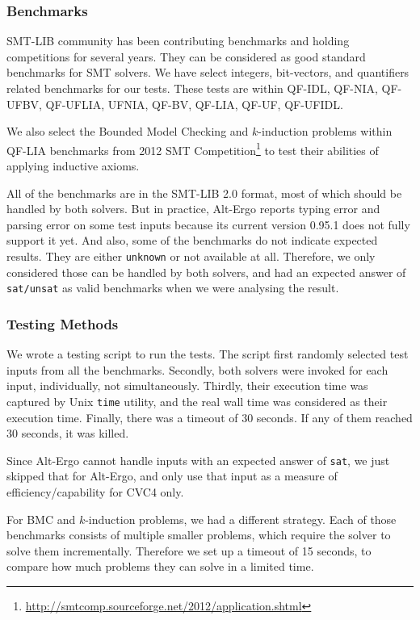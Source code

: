 \documentclass[10pt,letter]{article}
\theoremstyle{definition}
\begin{document}
\subsubsection{Benchmarks}

SMT-LIB community has been contributing benchmarks and holding competitions for several years\cite{bs2010}. They can be considered as good standard benchmarks for SMT solvers. We have select integers, bit-vectors, and quantifiers related benchmarks for our tests. These tests are within QF-IDL, QF-NIA, QF-UFBV, QF-UFLIA, UFNIA, QF-BV, QF-LIA, QF-UF, QF-UFIDL.

We also select the Bounded Model Checking and $k$-induction problems within QF-LIA benchmarks from 2012 SMT Competition\footnote{\url{http://smtcomp.sourceforge.net/2012/application.shtml}}\cite{cok20122012}
to test their abilities of applying inductive axioms.

All of the benchmarks are in the SMT-LIB 2.0 format, most of which should be handled by both solvers. But in practice, Alt-Ergo reports typing error and parsing error on some test inputs because its current version 0.95.1 does not fully support it yet. And also, some of the benchmarks do not indicate expected results. They are either {\tt unknown} or not available at all. Therefore, we only considered those can be handled by both solvers, and had an expected answer of {\tt sat/unsat} as valid benchmarks when we were analysing the result.

\subsubsection{Testing Methods}

We wrote a testing script to run the tests. The script first randomly selected test inputs from all the benchmarks. Secondly, both solvers were invoked for each input, individually, not simultaneously. Thirdly, their execution time was captured by Unix {\tt time} utility, and the real wall time was considered as their execution time. Finally, there was a timeout of 30 seconds. If any of them reached 30 seconds, it was killed. 

Since Alt-Ergo cannot handle inputs with an expected answer of {\tt sat}, we just skipped that for Alt-Ergo, and only use that input as a measure of efficiency/capability for CVC4 only.

For BMC and $k$-induction problems, we had a different strategy. Each of those benchmarks consists of multiple smaller problems, which require the solver to solve them incrementally. Therefore we set up a timeout of 15 seconds, to compare how much problems they can solve in a limited time.
\end{document}
